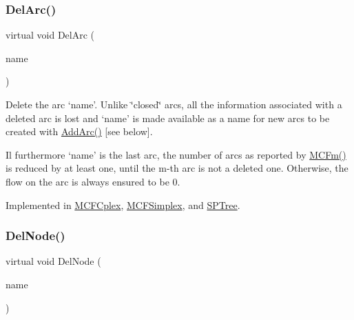 \mbox{\label{class_m_c_f_class_ae291d6625ff31a5fdcc1ef166e2dee34}} 
\subsubsection{\texorpdfstring{Del\+Arc()}{DelArc()}}
{\footnotesize\ttfamily virtual void Del\+Arc (\begin{DoxyParamCaption}\item[{\mbox{\hyperlink{class_m_c_f_class_a76aaabb20535c51a2752b93f6c38fe54}{c\+Index}}}]{name }\end{DoxyParamCaption})\hspace{0.3cm}{\ttfamily [pure virtual]}}

Delete the arc `name'. Unlike \char`\"{}closed\char`\"{} arcs, all the information associated with a deleted arc is lost and `name' is made available as a name for new arcs to be created with \mbox{\hyperlink{class_m_c_f_class_a564d624f62ccc0c130d733cc5470cb6d}{Add\+Arc()}} \mbox{[}see below\mbox{]}.

Il furthermore `name' is the last arc, the number of arcs as reported by \mbox{\hyperlink{class_m_c_f_class_ab4d5a0d0fc49882de0b4eb3146f1b7a6}{M\+C\+Fm()}} is reduced by at least one, until the m-\/th arc is not a deleted one. Otherwise, the flow on the arc is always ensured to be 0. 

Implemented in \mbox{\hyperlink{class_m_c_f_cplex_a3b6145c95b83f40a76d724eb2b92f80f}{M\+C\+F\+Cplex}}, \mbox{\hyperlink{class_m_c_f_simplex_a3b6145c95b83f40a76d724eb2b92f80f}{M\+C\+F\+Simplex}}, and \mbox{\hyperlink{class_s_p_tree_a3b6145c95b83f40a76d724eb2b92f80f}{S\+P\+Tree}}.

\mbox{\label{class_m_c_f_class_abecb8b32d512eea7daafba0e06ab4742}} 
\subsubsection{\texorpdfstring{Del\+Node()}{DelNode()}}
{\footnotesize\ttfamily virtual void Del\+Node (\begin{DoxyParamCaption}\item[{\mbox{\hyperlink{class_m_c_f_class_a76aaabb20535c51a2752b93f6c38fe54}{c\+Index}}}]{name }\end{DoxyParamCaption})\hspace{0.3cm}{\ttfamily [pure virtual]}}

